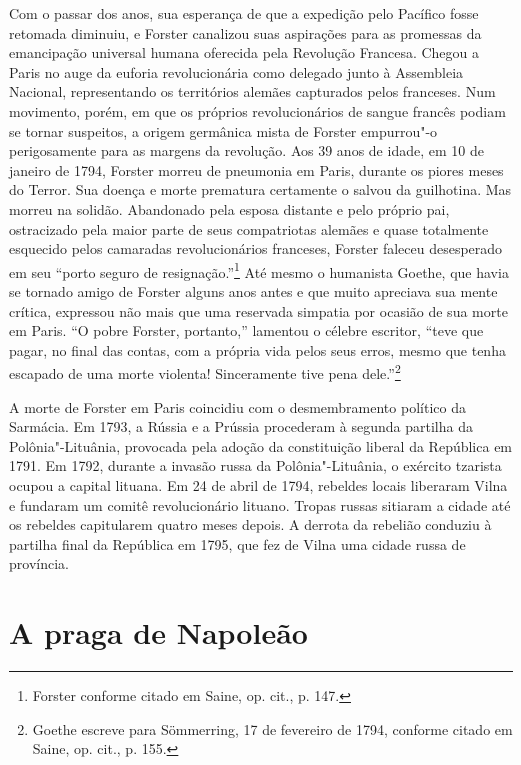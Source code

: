 Com o passar dos anos, sua esperança de que a expedição pelo Pacífico
fosse retomada diminuiu, e Forster canalizou suas aspirações para as
promessas da emancipação universal humana oferecida pela Revolução
Francesa. Chegou a Paris no auge da euforia revolucionária como delegado
junto à Assembleia Nacional, representando os territórios alemães
capturados pelos franceses. Num movimento, porém, em que os próprios
revolucionários de sangue francês podiam se tornar suspeitos, a origem
germânica mista de Forster empurrou"-o perigosamente para as margens da
revolução. Aos 39 anos de idade, em 10 de janeiro de 1794,
Forster morreu de pneumonia em Paris, durante os piores meses do Terror.
Sua doença e morte prematura certamente o salvou da guilhotina. Mas
morreu na solidão. Abandonado pela esposa distante e pelo próprio pai,
ostracizado pela maior parte de seus compatriotas alemães e quase
totalmente esquecido pelos camaradas revolucionários franceses, Forster
faleceu desesperado em seu ``porto seguro de resignação.''\footnote{Forster conforme citado em Saine, op. cit., p. 147.} Até mesmo o humanista Goethe, que havia se tornado amigo de Forster alguns anos antes e que
muito apreciava sua mente crítica, expressou não mais que uma reservada
simpatia por ocasião de sua morte em Paris. ``O pobre Forster,
portanto,'' lamentou o célebre escritor, ``teve que pagar, no final das
contas, com a própria vida pelos seus erros, mesmo que tenha escapado de
uma morte violenta! Sinceramente tive pena dele.''\footnote{Goethe escreve para Sömmerring, 17 de fevereiro de 1794, conforme citado em Saine, op. cit., p. 155.}

A morte de Forster em Paris coincidiu com o desmembramento político da
Sarmácia. Em 1793, a Rússia e a Prússia procederam à segunda partilha da
Polônia"-Lituânia, provocada pela adoção da constituição liberal da
República em 1791. Em 1792, durante a invasão russa da Polônia"-Lituânia,
o exército tzarista ocupou a capital lituana. Em 24 de abril de 1794,
rebeldes locais liberaram Vilna e fundaram um comitê revolucionário
lituano. Tropas russas sitiaram a cidade até os rebeldes capitularem
quatro meses depois. A derrota da rebelião conduziu à partilha final da
República em 1795, que fez de Vilna uma cidade russa de província.

\chapter{A praga de Napoleão}


